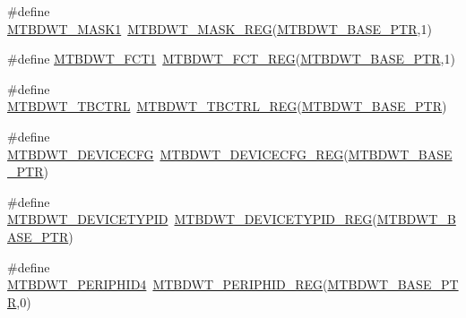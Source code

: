 \begin{DoxyCompactItemize}
\item 
\#define \hyperlink{group___m_t_b_d_w_t___register___accessor___macros_gae894a7aae5ee9a3e87a83d33342451da}{M\+T\+B\+D\+W\+T\+\_\+\+M\+A\+S\+K1}~\hyperlink{group___m_t_b_d_w_t___register___accessor___macros_ga32be33e09a6c10c58485d2beefb6facf}{M\+T\+B\+D\+W\+T\+\_\+\+M\+A\+S\+K\+\_\+\+R\+EG}(\hyperlink{group___m_t_b_d_w_t___peripheral_ga97d048bfb5a11293a38c444b8347ff42}{M\+T\+B\+D\+W\+T\+\_\+\+B\+A\+S\+E\+\_\+\+P\+TR},1)
\item 
\#define \hyperlink{group___m_t_b_d_w_t___register___accessor___macros_gad659254c17bdfa6f4d25b8eeccc7eec2}{M\+T\+B\+D\+W\+T\+\_\+\+F\+C\+T1}~\hyperlink{group___m_t_b_d_w_t___register___accessor___macros_ga6bb0978c19eed749885efdb3c899edab}{M\+T\+B\+D\+W\+T\+\_\+\+F\+C\+T\+\_\+\+R\+EG}(\hyperlink{group___m_t_b_d_w_t___peripheral_ga97d048bfb5a11293a38c444b8347ff42}{M\+T\+B\+D\+W\+T\+\_\+\+B\+A\+S\+E\+\_\+\+P\+TR},1)
\item 
\#define \hyperlink{group___m_t_b_d_w_t___register___accessor___macros_gaabe3e4c27fdc7c18a745c1129d06a68d}{M\+T\+B\+D\+W\+T\+\_\+\+T\+B\+C\+T\+RL}~\hyperlink{group___m_t_b_d_w_t___register___accessor___macros_ga42ec173a2526de3b3d082bd99a19b6a5}{M\+T\+B\+D\+W\+T\+\_\+\+T\+B\+C\+T\+R\+L\+\_\+\+R\+EG}(\hyperlink{group___m_t_b_d_w_t___peripheral_ga97d048bfb5a11293a38c444b8347ff42}{M\+T\+B\+D\+W\+T\+\_\+\+B\+A\+S\+E\+\_\+\+P\+TR})
\item 
\#define \hyperlink{group___m_t_b_d_w_t___register___accessor___macros_ga5d85a355ea3763f3ce91c860b33ecd40}{M\+T\+B\+D\+W\+T\+\_\+\+D\+E\+V\+I\+C\+E\+C\+FG}~\hyperlink{group___m_t_b_d_w_t___register___accessor___macros_ga918d93e20e19d7e33c59ebd700dc5f74}{M\+T\+B\+D\+W\+T\+\_\+\+D\+E\+V\+I\+C\+E\+C\+F\+G\+\_\+\+R\+EG}(\hyperlink{group___m_t_b_d_w_t___peripheral_ga97d048bfb5a11293a38c444b8347ff42}{M\+T\+B\+D\+W\+T\+\_\+\+B\+A\+S\+E\+\_\+\+P\+TR})
\item 
\#define \hyperlink{group___m_t_b_d_w_t___register___accessor___macros_gae3c0de787e5ffb8689542299ac138e16}{M\+T\+B\+D\+W\+T\+\_\+\+D\+E\+V\+I\+C\+E\+T\+Y\+P\+ID}~\hyperlink{group___m_t_b_d_w_t___register___accessor___macros_gae85feea5348b4fe3e3084e1a58b556fd}{M\+T\+B\+D\+W\+T\+\_\+\+D\+E\+V\+I\+C\+E\+T\+Y\+P\+I\+D\+\_\+\+R\+EG}(\hyperlink{group___m_t_b_d_w_t___peripheral_ga97d048bfb5a11293a38c444b8347ff42}{M\+T\+B\+D\+W\+T\+\_\+\+B\+A\+S\+E\+\_\+\+P\+TR})
\item 
\#define \hyperlink{group___m_t_b_d_w_t___register___accessor___macros_ga8ef257fe5f8d95bd784008c0fed9375e}{M\+T\+B\+D\+W\+T\+\_\+\+P\+E\+R\+I\+P\+H\+I\+D4}~\hyperlink{group___m_t_b_d_w_t___register___accessor___macros_ga91f7c6dfb35fc0d26fb6b3fae63757fc}{M\+T\+B\+D\+W\+T\+\_\+\+P\+E\+R\+I\+P\+H\+I\+D\+\_\+\+R\+EG}(\hyperlink{group___m_t_b_d_w_t___peripheral_ga97d048bfb5a11293a38c444b8347ff42}{M\+T\+B\+D\+W\+T\+\_\+\+B\+A\+S\+E\+\_\+\+P\+TR},0)

\end{DoxyCompactItemize}
